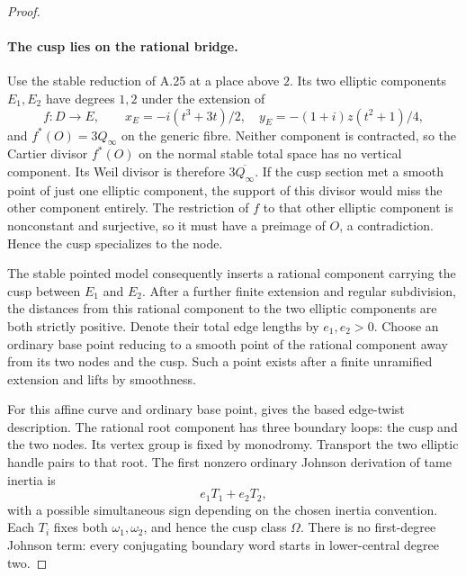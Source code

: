 \begin{proof}
\paragraph{The cusp lies on the rational bridge.}
Use the stable reduction of A.25 at a place above $2$.
Its two elliptic components $E_1,E_2$ have degrees $1,2$
under the extension of
\[
 f:D\longrightarrow E,\qquad
 x_E=-i(t^3+3t)/2,\quad
 y_E=-(1+i)z(t^2+1)/4,
\]
and $f^*(O)=3Q_\infty$ on the generic fibre. Neither
component is contracted, so the Cartier divisor $f^*(O)$
on the normal stable total space has no vertical component.
Its Weil divisor is therefore $3\overline{Q_\infty}$.
If the cusp section met a smooth point of just one
elliptic component, the support of this divisor would
miss the other component entirely. The restriction of
$f$ to that other elliptic component is nonconstant and
surjective, so it must have a preimage of $O$, a
contradiction. Hence the cusp specializes to the node.

The stable pointed model consequently inserts a rational
component carrying the cusp between $E_1$ and $E_2$.
After a further finite extension and regular subdivision,
the distances from this rational component to the two
elliptic components are both strictly positive. Denote
their total edge lengths by $e_1,e_2>0$. Choose an ordinary
base point reducing to a smooth point of the rational
component away from its two nodes and the cusp. Such a
point exists after a finite unramified extension and lifts
by smoothness.

For this affine curve and ordinary base point,
\cite[Definition 3.1.5 and Theorem 3.1.6]{fghBettsDogra}
gives the based edge-twist description. The rational root
component has three boundary loops: the cusp and the two
nodes. Its vertex group is fixed by monodromy. Transport
the two elliptic handle pairs to that root. The first
nonzero ordinary Johnson derivation of tame inertia is
\[
                            e_1T_1+e_2T_2,
                                                        \tag{A.27.9}
\]
with a possible simultaneous sign depending on the
chosen inertia convention. Each $T_i$ fixes both
$\omega_1,\omega_2$, and hence the cusp class $\Omega$.
There is no first-degree Johnson term: every conjugating
boundary word starts in lower-central degree two.


\end{proof}
